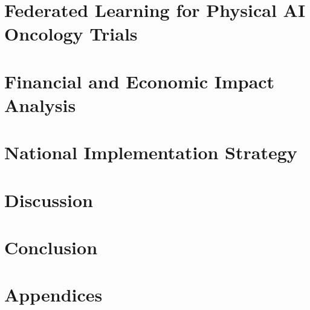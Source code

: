 \documentclass[a4paper,12pt,twoside]{article}
\begin{document}
\section{Federated Learning for Physical AI Oncology Trials}
\label{sec:federated-learning}

\newpage

\section{Financial and Economic Impact Analysis}
\label{sec:financial}

\newpage

\section{National Implementation Strategy}
\label{sec:implementation}

\newpage

\section{Discussion}
\label{sec:discussion}

\newpage

\section{Conclusion}
\label{sec:conclusion}

\newpage

\pagestyle{contents}


\newpage

\section*{Appendices}

\end{document}
